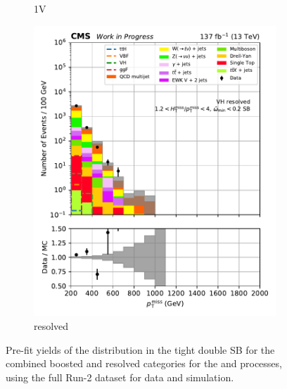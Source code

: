 \begin{figure}[htbp]
\begin{subfigure}[b]{0.24\textwidth}
        \caption{\VH 1V}
    \end{subfigure}
    \hfill
    \begin{subfigure}[b]{0.24\textwidth}
        \includegraphics[width=\textwidth]{figures/region_plots/full_Run2/sideband_0/VH_resolved.pdf}
        \caption{\VH resolved}
    \end{subfigure}
    \caption[Pre-fit yields of the \ptmiss distribution in the tight double sideband for the combined boosted and resolved categories for the \ttH and \VH processes, using the full Run-2 dataset for data and simulation]{Pre-fit yields of the \ptmiss distribution in the tight double \gls{SB} for the combined boosted and resolved categories for the \ttH and \VH processes, using the full Run-2 dataset for data and simulation.}
    \label{fig:htoinv_sb_yields_comb2016to18_tight_double}
\end{figure}

